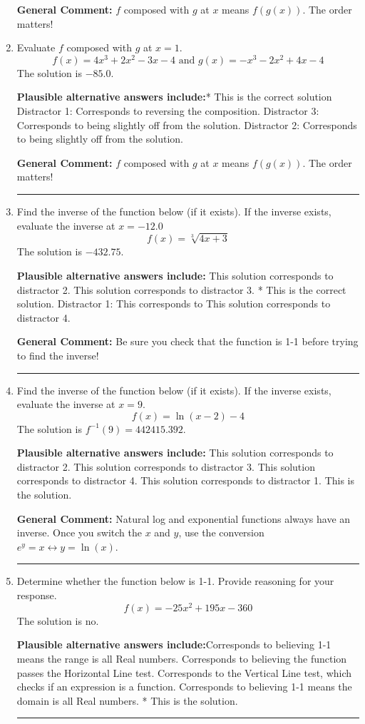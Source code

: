 \documentclass{extbook}[14pt]
\newcommand{\litem}[1]{\item #1

\rule{\textwidth}{0.4pt}}
\begin{document}
\begin{enumerate}
{\begin{enumerate}[label=\Alph*.]
\end{enumerate}

\textbf{General Comment:} $f$ composed with $g$ at $x$ means $f(g(x))$. The order matters!
}
\litem{
Evaluate $f$ composed with $g$ at $x=1$.
\[ f(x) = 4x^{3} +2 x^{2} -3 x -4 \text{ and } g(x) = -x^{3} -2 x^{2} +4 x -4 \]The solution is \( -85.0 \).\begin{enumerate}[label=\Alph*.]
\textbf{Plausible alternative answers include:}* This is the correct solution
 Distractor 1: Corresponds to reversing the composition.
 Distractor 3: Corresponds to being slightly off from the solution.
 Distractor 2: Corresponds to being slightly off from the solution.

\end{enumerate}

\textbf{General Comment:} $f$ composed with $g$ at $x$ means $f(g(x))$. The order matters!
}
\litem{
Find the inverse of the function below (if it exists). If the inverse exists, evaluate the inverse at $x = -12.0$
\[ f(x) = \sqrt[3]{4 x + 3} \]The solution is \( -432.75 \).\begin{enumerate}[label=\Alph*.]
\textbf{Plausible alternative answers include:} This solution corresponds to distractor 2.
 This solution corresponds to distractor 3.
* This is the correct solution.
 Distractor 1: This corresponds to 
 This solution corresponds to distractor 4.
\end{enumerate}

\textbf{General Comment:} Be sure you check that the function is 1-1 before trying to find the inverse!
}
\litem{
Find the inverse of the function below (if it exists). If the inverse exists, evaluate the inverse at $x = 9$.
\[ f(x) = \ln{(x-2)}-4 \]The solution is \( f^{-1}(9) = 442415.392 \).\begin{enumerate}[label=\Alph*.]
\textbf{Plausible alternative answers include:} This solution corresponds to distractor 2.
 This solution corresponds to distractor 3.
 This solution corresponds to distractor 4.
 This solution corresponds to distractor 1.
 This is the solution.
\end{enumerate}

\textbf{General Comment:} Natural log and exponential functions always have an inverse. Once you switch the $x$ and $y$, use the conversion $ e^y = x \leftrightarrow y=\ln(x)$.
}
\litem{
Determine whether the function below is 1-1. Provide reasoning for your response.
\[ f(x) = -25 x^2 + 195 x - 360 \]The solution is \( \text{no} \).\begin{enumerate}[label=\Alph*.]
\textbf{Plausible alternative answers include:}Corresponds to believing 1-1 means the range is all Real numbers.
Corresponds to believing the function passes the Horizontal Line test.
Corresponds to the Vertical Line test, which checks if an expression is a function.
Corresponds to believing 1-1 means the domain is all Real numbers.
* This is the solution.
\end{enumerate}

}
\end{enumerate}
\end{document}
